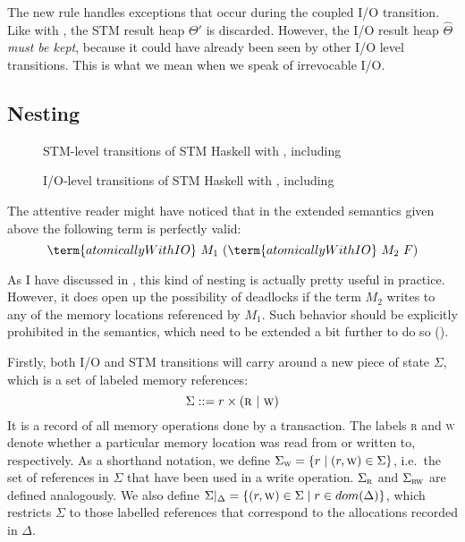The new rule  handles exceptions that occur during the coupled I/O transition.
Like with , the STM result heap $\Theta'$ is discarded.
However, the I/O result heap $\hat{\Theta}$ \emph{must be kept}, because it could have already been seen by other I/O level transitions.
This is what we mean when we speak of irrevocable I/O.


\subsection{Nesting}

\begin{figure}

\caption{STM-level transitions of STM Haskell with , including }
\label{fig:step2-stm}
\end{figure}

\begin{figure}

\caption{I/O-level transitions of STM Haskell with , including }
\label{fig:step2-io}
\end{figure}

The attentive reader might have noticed that in the extended semantics given above the following term is perfectly valid:
$$
\term{atomicallyWithIO}\ M_1\ (\term{atomicallyWithIO}\ M_2\ F)
$$

As I have discussed in , this kind of nesting is actually pretty useful in practice.
However, it does open up the possibility of deadlocks if the term $M_2$ writes to any of the memory locations referenced by $M_1$.
Such behavior should be explicitly prohibited in the semantics, which need to be extended a bit further to do so ().

Firstly, both I/O and STM transitions will carry around a new piece of state $\Sigma$, which is a set of labeled memory references:
$$
\Sigma ::= r \times (\textsc{r}\ \vert\ \textsc{w})
$$
It is a record of all memory operations done by a transaction.
The labels \textsc{r} and \textsc{w} denote whether a particular memory location was read from or written to, respectively.
As a shorthand notation, we define $\Sigma_\textsc{w}=\{r \mid (r,\textsc{w}) \in \Sigma\}$, i.e.\ the set of references in $\Sigma$ that have been used in a write operation.
$\Sigma_\textsc{r}$ and $\Sigma_\textsc{rw}$ are defined analogously.
We also define $\Sigma\vert_\Delta=\{ (r,\textsc{w}) \in \Sigma \mid r \in dom(\Delta)\}$, which restricts $\Sigma$ to those labelled references that correspond to the allocations recorded in $\Delta$.

